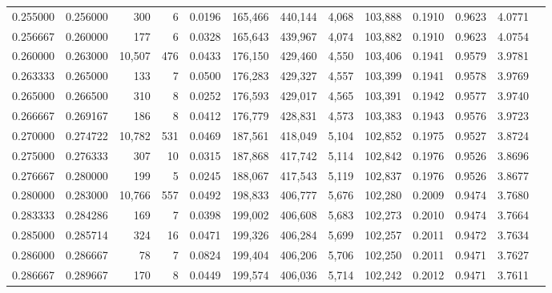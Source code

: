 \begin{tabular}{rrrrrrrrrrrrr}
0.255000 & 0.256000 &    300 &     6 &                                     0.0196 & 165,466 & 440,144 &   4,068 & 103,888 & 0.1910 & 0.9623 & 4.0771 \\
0.256667 & 0.260000 &    177 &     6 &                                     0.0328 & 165,643 & 439,967 &   4,074 & 103,882 & 0.1910 & 0.9623 & 4.0754 \\
0.260000 & 0.263000 & 10,507 &   476 &                                     0.0433 & 176,150 & 429,460 &   4,550 & 103,406 & 0.1941 & 0.9579 & 3.9781 \\
0.263333 & 0.265000 &    133 &     7 &                                     0.0500 & 176,283 & 429,327 &   4,557 & 103,399 & 0.1941 & 0.9578 & 3.9769 \\
0.265000 & 0.266500 &    310 &     8 &                                     0.0252 & 176,593 & 429,017 &   4,565 & 103,391 & 0.1942 & 0.9577 & 3.9740 \\
0.266667 & 0.269167 &    186 &     8 &                                     0.0412 & 176,779 & 428,831 &   4,573 & 103,383 & 0.1943 & 0.9576 & 3.9723 \\
0.270000 & 0.274722 & 10,782 &   531 &                                     0.0469 & 187,561 & 418,049 &   5,104 & 102,852 & 0.1975 & 0.9527 & 3.8724 \\
0.275000 & 0.276333 &    307 &    10 &                                     0.0315 & 187,868 & 417,742 &   5,114 & 102,842 & 0.1976 & 0.9526 & 3.8696 \\
0.276667 & 0.280000 &    199 &     5 &                                     0.0245 & 188,067 & 417,543 &   5,119 & 102,837 & 0.1976 & 0.9526 & 3.8677 \\
0.280000 & 0.283000 & 10,766 &   557 &                                     0.0492 & 198,833 & 406,777 &   5,676 & 102,280 & 0.2009 & 0.9474 & 3.7680 \\
0.283333 & 0.284286 &    169 &     7 &                                     0.0398 & 199,002 & 406,608 &   5,683 & 102,273 & 0.2010 & 0.9474 & 3.7664 \\
0.285000 & 0.285714 &    324 &    16 &                                     0.0471 & 199,326 & 406,284 &   5,699 & 102,257 & 0.2011 & 0.9472 & 3.7634 \\
0.286000 & 0.286667 &     78 &     7 &                                     0.0824 & 199,404 & 406,206 &   5,706 & 102,250 & 0.2011 & 0.9471 & 3.7627 \\
0.286667 & 0.289667 &    170 &     8 &                                     0.0449 & 199,574 & 406,036 &   5,714 & 102,242 & 0.2012 & 0.9471 & 3.7611 \\

\end{tabular}
